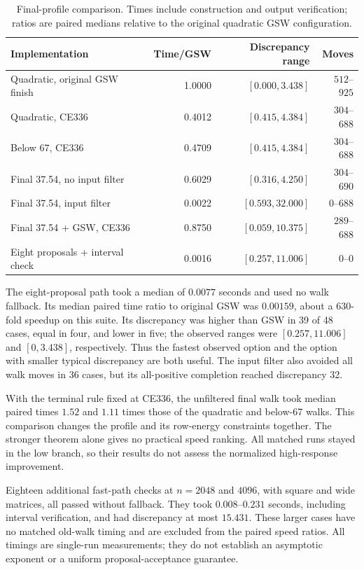 \documentclass[11pt]{amsart}
\theoremstyle{definition}\newtheorem{definition}[theorem]{Definition}
\theoremstyle{remark}\newtheorem{remark}[theorem]{Remark}
\numberwithin{equation}{section}
\begin{document}
\begin{table}[htbp]
\centering\small
\caption{Final-profile comparison. Times include construction and output verification; ratios are paired medians relative to the original quadratic GSW configuration.}
\label{tab:final-comparison}
\begin{tabular}{@{}lrrr@{}}
\toprule
Implementation & Time/GSW & Discrepancy range & Moves\\
\midrule
Quadratic, original GSW finish & 1.0000 & $[0.000,3.438]$ & $512$--$925$\\
Quadratic, CE336 & 0.4012 & $[0.415,4.384]$ & $304$--$688$\\
Below 67, CE336 & 0.4709 & $[0.415,4.384]$ & $304$--$688$\\
Final 37.54, no input filter & 0.6029 & $[0.316,4.250]$ & $304$--$690$\\
Final 37.54, input filter & 0.0022 & $[0.593,32.000]$ & $0$--$688$\\
Final 37.54 + GSW, CE336 & 0.8750 & $[0.059,10.375]$ & $289$--$688$\\
Eight proposals + interval check & 0.0016 & $[0.257,11.006]$ & $0$--$0$\\
\bottomrule
\end{tabular}
\end{table}

The eight-proposal path took a median of $0.0077$ seconds and used no
walk fallback. Its median paired time ratio to original GSW was
$0.00159$, about a $630$-fold speedup on this suite. Its discrepancy was
higher than GSW in 39 of 48 cases, equal in four, and lower in five;
the observed ranges were $[0.257,11.006]$ and $[0,3.438]$, respectively.
Thus the fastest observed option and the option with smaller typical
discrepancy are both useful. The input filter also avoided all walk moves
in 36 cases, but its all-positive completion reached discrepancy 32.

With the terminal rule fixed at CE336, the unfiltered final walk took
median paired times $1.52$ and $1.11$ times those of the quadratic and
below-67 walks. This comparison changes the profile and its row-energy
constraints together. The stronger theorem alone gives no practical
speed ranking. All matched runs stayed in the low branch, so their
results do not assess the normalized high-response improvement.

Eighteen additional fast-path checks at $n=2048$ and $4096$, with square
and wide matrices, all passed without fallback. They took $0.008$--$0.231$
seconds, including interval verification, and had discrepancy at most
$15.431$. These larger cases have no matched old-walk timing and are
excluded from the paired speed ratios. All timings are single-run
measurements; they do not establish an asymptotic exponent or a uniform
proposal-acceptance guarantee.
\end{document}
